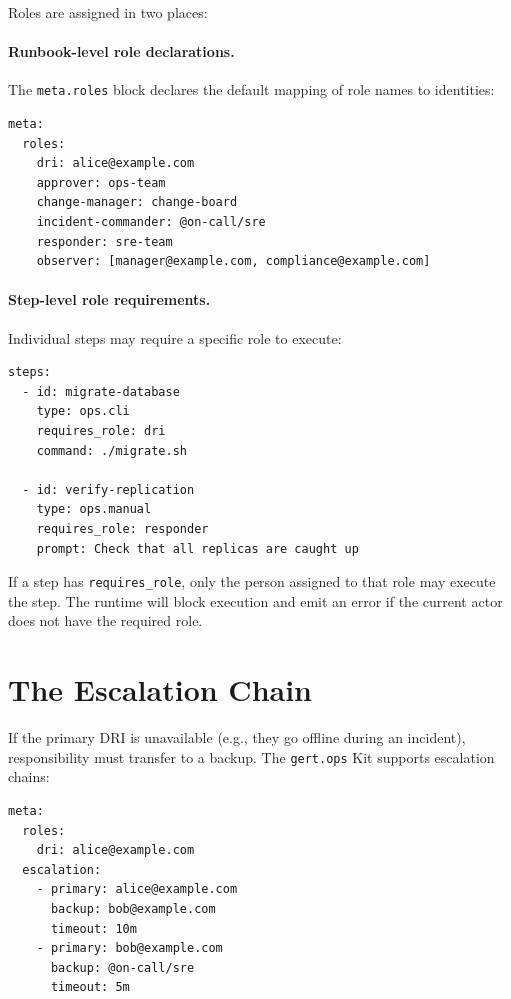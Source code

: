 Roles are assigned in two places:

\paragraph{Runbook-level role declarations.}
The \texttt{meta.roles} block declares the default mapping of role names to identities:

\begin{verbatim}
meta:
  roles:
    dri: alice@example.com
    approver: ops-team
    change-manager: change-board
    incident-commander: @on-call/sre
    responder: sre-team
    observer: [manager@example.com, compliance@example.com]
\end{verbatim}

\paragraph{Step-level role requirements.}
Individual steps may require a specific role to execute:

\begin{verbatim}
steps:
  - id: migrate-database
    type: ops.cli
    requires_role: dri
    command: ./migrate.sh

  - id: verify-replication
    type: ops.manual
    requires_role: responder
    prompt: Check that all replicas are caught up
\end{verbatim}

If a step has \texttt{requires\_role}, only the person assigned to that role may execute the step. The runtime will block execution and emit an error if the current actor does not have the required role.

\section{The Escalation Chain}

If the primary DRI is unavailable (e.g., they go offline during an incident), responsibility must transfer to a backup. The \texttt{gert.ops} Kit supports escalation chains:

\begin{verbatim}
meta:
  roles:
    dri: alice@example.com
  escalation:
    - primary: alice@example.com
      backup: bob@example.com
      timeout: 10m
    - primary: bob@example.com
      backup: @on-call/sre
      timeout: 5m
\end{verbatim}


